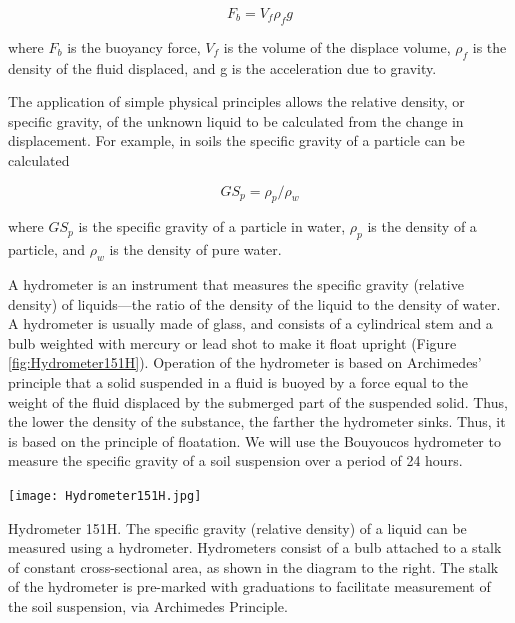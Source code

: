 \documentclass{tufte-handout}
\begin{document}
\begin{equation}
F_b = V_f \rho_f g
\end{equation}

\noindent where $F_b$ is the buoyancy force, $V_f$ is the volume of the displace volume, $\rho_f$ is the density of the fluid displaced, and g is the acceleration due to gravity.

The application of simple physical principles allows the relative density, or specific gravity, of the unknown liquid to be calculated from the change in displacement. For example, in soils the specific gravity of a particle can be calculated 

\begin{equation}
GS_p = \rho_p / \rho_w
\end{equation}

\noindent where $GS_p$ is the specific gravity of a particle in water, 
$\rho_p$ is the density of a particle, and
$\rho_w$ is the density of pure water.



A hydrometer is an instrument that measures the specific gravity (relative density) of liquids---the ratio of the density of the liquid to the density of water. A hydrometer is usually made of glass, and consists of a cylindrical stem and a bulb weighted with mercury or lead shot to make it float upright (Figure \ref{fig:Hydrometer151H}). Operation of the hydrometer is based on Archimedes' principle that a solid suspended in a fluid is buoyed by a force equal to the weight of the fluid displaced by the submerged part of the suspended solid. Thus, the lower the density of the substance, the farther the hydrometer sinks. Thus, it is based on the principle of floatation. We will use the Bouyoucos hydrometer to measure the specific gravity of a soil suspension over a period of 24 hours. 

\begin{marginfigure}
	\texttt{[image: Hydrometer151H.jpg]}
	\caption{Hydrometer 151H. The specific gravity (relative density) of a liquid can be measured using a hydrometer. Hydrometers consist of a bulb attached to a stalk of constant cross-sectional area, as shown in the diagram to the right. The stalk of the hydrometer is pre-marked with graduations to facilitate measurement of the soil suspension, via Archimedes Principle.}
	\label{fig:Hydrometer151H}
\end{marginfigure}
\end{document}
